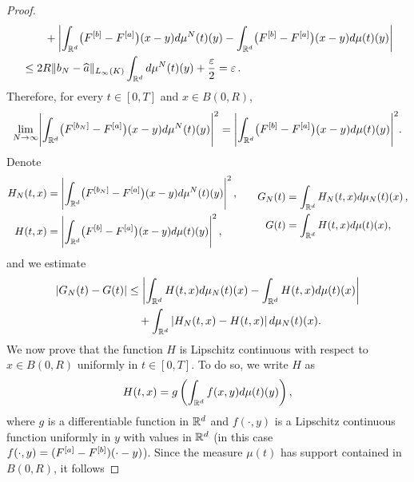 \begin{proof}
\begin{align*}
			&\qquad +\biggl|\int_{\mathbb{R}^d}\bigl(F^{[b]}-F^{[a]}\bigr)(x-y)d\mu^{N}(t)(y)
					-\int_{\mathbb{R}^d}\bigl(F^{[b]}-F^{[a]}\bigr)(x-y)d\mu(t)(y)\biggr|\\
			&\leq2R \| b_{N}-\widehat  a\|_{L_\infty(K)}\int_{\mathbb{R}^d}d\mu^{N}(t)(y)+\frac{\varepsilon}{2}=\varepsilon\,.
	\end{align*}
	Therefore, for every $t \in [0,T]$ and $x \in B(0,R)$, 
	\begin{align}\label{firstlim}
		\lim_{N\rightarrow\infty}\Biggl|\int_{\mathbb{R}^d}\bigl(F^{[b_{N}]}-F^{[a]}\bigr)(x-y)d\mu^{N}(t)(y)\Biggr|^2
			=\Biggl|\int_{\mathbb{R}^d}\bigl(F^{[b]}-F^{[a]}\bigr)(x-y)d\mu(t)(y)\Biggr|^2.
	\end{align}
	Denote
	\begin{equation*}
	\begin{split}
		H_N(t,x)&=\Biggl|\int_{\mathbb{R}^d}\bigl(F^{[b_{N}]}-F^{[a]}\bigr)(x-y)d\mu^{N}(t)(y)\Biggr|^2\,, \\
		H(t,x)&= \Biggl|\int_{\mathbb{R}^d}\bigl(F^{[b]}-F^{[a]}\bigr)(x-y)d\mu(t)(y)\Biggr|^2\,,
		\end{split}
		\qquad
		\begin{split}
		G_N(t)&= \int_{\mathbb{R}^d}H_N(t,x)d\mu_N(t)(x)\,,\\
		G(t)&= \int_{\mathbb{R}^d}H(t,x)d\mu(t)(x),
		\end{split}	
	\end{equation*}
	and we estimate
	\begin{align}
		|G_N(t)-G(t)|&\leq \left|\int_{\mathbb{R}^d}H(t,x)d\mu_N(t)(x) - \int_{\mathbb{R}^d}H(t,x)d\mu(t)(x)\right| \nonumber\\
		&\quad + \int_{\mathbb{R}^d}\left|H_N(t,x) - H(t,x)\right|d\mu_N(t)(x). \label{pippo3}
	\end{align}
	We now prove that the function $H$ is Lipschitz continuous with respect to $x \in B(0,R)$ uniformly in $t \in [0,T]$. To do so, we write $H$ as
	\begin{align*}
	H(t,x) = g\left(\int_{\mathbb{R}^d} f(x,y) d\mu(t)(y)\right),
	\end{align*}
	where $g$ is a differentiable function in $\mathbb{R}^d$ and $f(\cdot,y)$ is a Lipschitz continuous function uniformly in $y$ with values in $\mathbb{R}^d$ (in this case $f(\cdot,y)=(F^{[a]} -F^{[b]})(\cdot -y)$). Since the measure $\mu(t)$ has support contained in $B(0,R)$, it follows

\end{proof}
